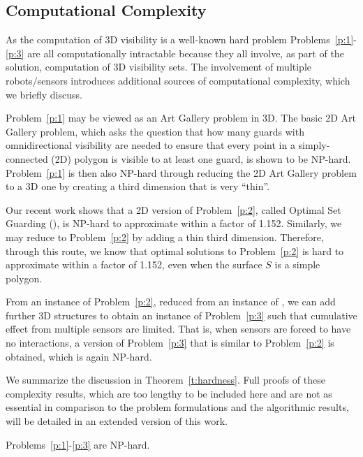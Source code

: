 \subsection{Computational Complexity}\label{subsec:complexity}
\vspace{-1mm}
As the computation of 3D visibility is a well-known hard problem \cite{canny1987new}
Problems~\ref{p:1}-\ref{p:3} are all computationally intractable because they all involve, as part of the solution, computation of 3D visibility sets. The involvement of multiple robots/sensors introduces additional sources of computational complexity, which we briefly discuss. 

Problem~\ref{p:1} may be viewed as an Art Gallery \cite{o1987art} problem in 3D. The basic 2D Art Gallery problem, which asks the question that how many guards with omnidirectional visibility are needed to ensure that every point in a simply-connected (2D) polygon is visible to at least one guard, is shown to be NP-hard\cite{lee1986computational}. Problem~\ref{p:1} is then also NP-hard through reducing the 2D Art Gallery problem to a 3D one by creating a third dimension that is very ``thin''.

Our recent work \cite{fengyu2020optimally} shows that a 2D version of Problem~\ref{p:2}, called Optimal Set Guarding (\osg), is NP-hard to approximate within a factor of 1.152. Similarly, we may reduce \osg to Problem~\ref{p:2} by adding a thin third dimension. Therefore, through this route, we know that optimal solutions to Problem~\ref{p:2} is hard to approximate within a factor of 1.152, even when the surface $S$  is a simple polygon. 

From an instance of Problem~\ref{p:2}, reduced from an instance of \osg, we can add further 3D structures to obtain an instance of Problem~\ref{p:3} such that cumulative effect from multiple sensors are limited. That is, when sensors are forced to have no interactions, a version of Problem~\ref{p:3} that is similar to Problem~\ref{p:2} is obtained, which is again NP-hard. 

We summarize the discussion in Theorem~\ref{t:hardness}. Full proofs of these complexity results, which are too lengthy to be included here and are not as essential in comparison to the problem formulations and the algorithmic results, will be detailed in an extended version of this work. 
\vspace{-1mm}

\begin{theorem}\label{t:hardness}
Problems~\ref{p:1}-\ref{p:3} are NP-hard.
\end{theorem}
    \vspace{-2mm}




